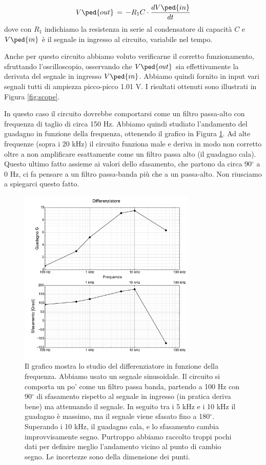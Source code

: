 \begin{equation}
        V\ped{out}\,=\,-R_1C \cdot \frac{dV\ped{in}}{dt}
\end{equation}
%
dove con $R_1$ indichiamo la resistenza in serie al condensatore di capacità $C$ e
$V\ped{in}$ è il segnale in ingresso al circuito, variabile nel tempo.

Anche per questo circuito abbiamo voluto verificarne il corretto funzionamento, sfruttando l'oscilloscopio, osservando che $V\ped{out}$ sia effettivamente la derivata del segnale in ingresso $V\ped{in}$. Abbiamo quindi fornito in input vari segnali
tutti di ampiezza picco-picco 1.01 V. I risultati ottenuti sono illustrati in Figura \ref{fig:scope}.

In questo caso il circuito dovrebbe comportarsi come un filtro passa-alto con frequenza di taglio di circa 150 Hz.
Abbiamo quindi studiato l'andamento del guadagno in funzione
della frequenza, ottenendo il grafico in Figura \ref{fig:GGG}. Ad alte frequenze (sopra i 20 kHz) il circuito funziona male e
deriva in modo non corretto oltre a non amplificare esattamente come un filtro passa alto (il guadagno cala).
Questo ultimo fatto assieme ai valori dello sfasamento, che partono da circa 90$^\circ$ a 0 Hz, ci fa pensare a un filtro
passa-banda più che a un passa-alto. Non riusciamo a spiegarci questo fatto.

\begin{figure}
    \includegraphics[width=0.75\textwidth]{diff.pdf}
    \caption{Il grafico mostra lo studio del differenziatore in funzione della frequenza.
        Abbiamo usato un segnale sinusoidale. Il circuito si comporta
        un po' come un filtro passa banda, partendo a 100 Hz con 90$^\circ$ di sfasamento rispetto al segnale in ingresso
        (in pratica deriva bene) ma attenuando il segnale. In seguito tra i 5 kHz e i 10 kHz il guadagno è massimo,
        ma il segnale viene sfasato fino a 180$^\circ$. Superando i 10 kHz, il guadagno cala, e lo sfasamento cambia
        improvvisamente segno. Purtroppo abbiamo raccolto troppi pochi dati per definire meglio l'andamento vicino al punto
        di cambio segno. Le incertezze sono della dimensione dei punti.}
    \label{fig:GGG}
\end{figure}
